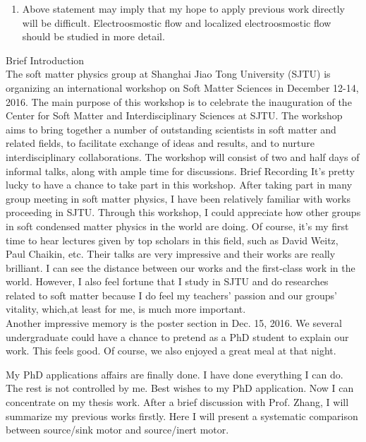 \documentclass[fontsize=11pt, %
                             paper=a4, %
                             twoside, %
                             captions=tableheading,
                             index=totoc,
                             hyperref]{labbook}
\begin{document}
\begin{addmargin}[4cm]{0cm}
\begin{enumerate}
\item
Above statement may imply that my hope to apply previous work directly will be difficult. Electroosmostic flow and localized electroosmostic flow should be studied in more detail.
\end{enumerate}
\large{Brief Introduction}\\
The soft matter physics group at Shanghai Jiao Tong University (SJTU) is organizing an international workshop on Soft Matter Sciences in December 12-14, 2016. The main purpose of this workshop is to celebrate the inauguration of the Center for Soft Matter and Interdisciplinary Sciences at SJTU. The workshop aims to bring together a number of outstanding scientists in soft matter and related fields, to facilitate exchange of ideas and results, and to nurture interdisciplinary collaborations. The workshop will consist of two and half days of informal talks, along with ample time for discussions.
\large{Brief Recording}
It's pretty lucky to have a chance to take part in this workshop. After taking part in many group meeting in soft matter physics, I have been relatively familiar with works proceeding in SJTU. Through this workshop, I could appreciate how other groups in soft condensed matter physics in the world are doing. Of course, it's my first time to hear lectures given by top scholars in this field, such as David Weitz, Paul Chaikin, etc. Their talks are very impressive and their works are really brilliant. I can see the distance between our works and the first-class work in the world. However, I also feel fortune that I study in SJTU and do researches related to soft matter because I do feel my teachers' passion and our groups' vitality, which,at least for me, is much more important.\\
Another impressive memory is the poster section in Dec. 15, 2016. We several undergraduate could have a chance to pretend as a PhD student to explain our work. This feels good. Of course, we also enjoyed a great meal at that night.

My PhD applications affairs are finally done. I have done everything I can do. The rest is not controlled by me. Best wishes to my PhD application. Now I can concentrate on my thesis work. After a brief discussion with Prof. Zhang, I will summarize my previous works firstly. Here I will present a systematic comparison between source/sink motor and source/inert motor.\\


\end{addmargin}
\end{document}
